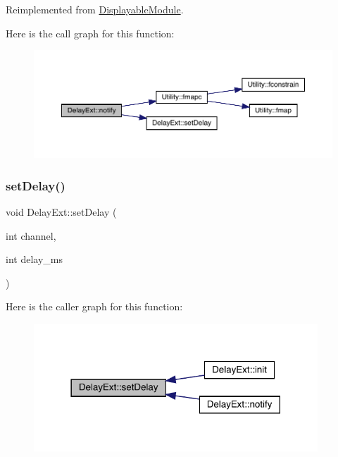 Reimplemented from \mbox{\hyperlink{class_displayable_module_a8ae5383931f10c54cff2feef2bc07dee}{Displayable\+Module}}.

Here is the call graph for this function\+:\nopagebreak
\begin{figure}[H]
\begin{center}
\leavevmode
\includegraphics[width=350pt]{class_delay_ext_a76001b2a3aad7ce1a2e1220ab7387be4_cgraph}
\end{center}
\end{figure}
\mbox{\label{class_delay_ext_a8b6e5eca2cdca8ea83a71cf57bec96dc}} 
\subsubsection{\texorpdfstring{set\+Delay()}{setDelay()}}
{\footnotesize\ttfamily void Delay\+Ext\+::set\+Delay (\begin{DoxyParamCaption}\item[{int}]{channel,  }\item[{int}]{delay\+\_\+ms }\end{DoxyParamCaption})}

Here is the caller graph for this function\+:\nopagebreak
\begin{figure}[H]
\begin{center}
\leavevmode
\includegraphics[width=302pt]{class_delay_ext_a8b6e5eca2cdca8ea83a71cf57bec96dc_icgraph}
\end{center}
\end{figure}
\mbox{\label{class_delay_ext_aced3df43297e5f6092fc2a652ab712d2}} 
